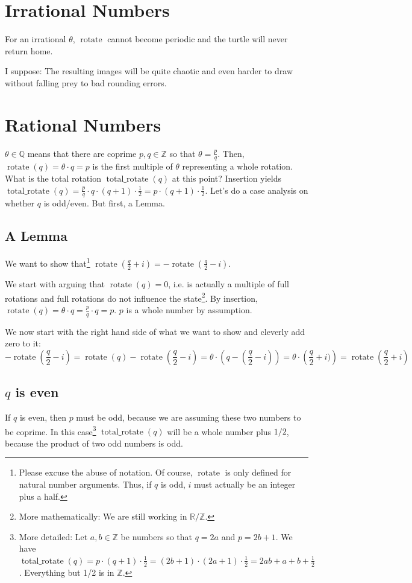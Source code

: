 \documentclass[pdftex,a4paper]{scrartcl}
\DeclareMathOperator{\rotate}{rotate}
\DeclareMathOperator{\total}{total\_rotate}
\begin{document}
\section{Irrational Numbers}
For an irrational \(\theta\), \(\rotate\) cannot become periodic and the turtle will never return home.

I suppose: The resulting images will be quite chaotic and even harder to draw without falling prey to bad rounding
errors.

\section{Rational Numbers}
\(\theta\in\mathbb{Q}\) means that there are coprime \(p,q\in\mathbb{Z}\) so that \(\theta=\frac{p}{q}\). Then,
\(\rotate(q)=\theta\cdot q=p\) is the first multiple of \(\theta\) representing a whole rotation. What is the total
rotation \(\total(q)\) at this point? Insertion yields \(\total(q)=\frac{p}{q}\cdot q\cdot(q+1)\cdot \frac{1}{2}
=p\cdot(q+1)\cdot\frac{1}{2}\).
Let's do a case analysis on whether \(q\) is odd/even. But first, a Lemma.

\subsection{A Lemma}
We want to show that\footnote{Please excuse the abuse of notation. Of course, \(\rotate\) is only defined for natural
number arguments. Thus, if \(q\) is odd, \(i\) must actually be an integer plus a half.}
\(\rotate(\frac{q}{2}+i)=-\rotate(\frac{q}{2}-i)\).

We start with arguing that \(\rotate(q)=0\), i.e. is actually a multiple of full rotations and full rotations do not
influence the state\footnote{More mathematically: We are still working in \(\mathbb{R}/\mathbb{Z}\).}. By insertion,
\(\rotate(q)=\theta\cdot q=\frac{p}{q}\cdot q=p\). \(p\) is a whole number by assumption.

We now start with the right hand side of what we want to show and cleverly add zero to it:
\[
-\rotate(\frac{q}{2}-i)
=\rotate(q)-\rotate(\frac{q}{2}-i)
=\theta\cdot\left(q-(\frac{q}{2}-i)\right)
=\theta\cdot\left(\frac{q}{2}+i)\right)
=\rotate(\frac{q}{2}+i)
\]

\subsection{$q$ is even}
If \(q\) is even, then \(p\) must be odd, because we are assuming these two numbers to be coprime.
In this case\footnote{More detailed: Let \(a,b\in\mathbb{Z}\) be numbers so that \(q=2a\) and \(p=2b+1\). We have
\(\total(q)=p\cdot(q+1)\cdot\frac{1}{2}=(2b+1)\cdot(2a+1)\cdot\frac{1}{2}=2ab+a+b+\frac{1}{2}\). Everything but 1/2 is
in \(\mathbb{Z}\).}
\(\total(q)\) will be a whole number plus \(1/2\), because the product of two odd numbers is odd.
\end{document}
